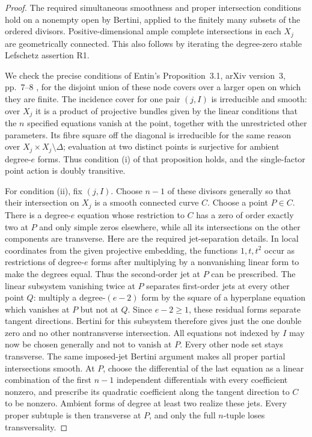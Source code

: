 \begin{proof}
The required simultaneous smoothness and proper intersection
conditions hold on a nonempty open by Bertini, applied to
the finitely many subsets of the ordered divisors.
Positive-dimensional ample complete intersections in each
$X_j$ are geometrically connected.  This also follows by
iterating the degree-zero stable Lefschetz assertion R1.

We check the precise conditions of Entin's
Proposition~3.1, arXiv version~3, pp.~7--8
\cite{Entin2021}, for the disjoint union of these node covers
over a larger open on which they are finite.
The incidence cover for one pair $(j,I)$ is irreducible and
smooth: over $X_j$ it is a product of projective bundles
given by the linear conditions that the $n$ specified
equations vanish at the point, together with the unrestricted
other parameters.  Its fibre square off the diagonal is
irreducible for the same reason over
$X_j\times X_j\setminus\Delta$; evaluation at two distinct
points is surjective for ambient degree-$e$ forms.
Thus condition (i) of that proposition holds, and the
single-factor point action is doubly transitive.

For condition (ii), fix $(j,I)$.  Choose $n-1$ of these
divisors generally so that their intersection on $X_j$ is
a smooth connected curve $C$.  Choose a point $P\in C$.
There is a degree-$e$ equation whose restriction to $C$
has a zero of order exactly two at $P$ and only simple
zeros elsewhere, while all its intersections on the other
components are transverse.  Here are the required
jet-separation details.  In local coordinates from the
given projective embedding, the functions $1,t,t^2$ occur
as restrictions of degree-$e$ forms after multiplying by a
nonvanishing linear form to make the degrees equal.
Thus the second-order jet at $P$ can be prescribed.
The linear subsystem vanishing twice at $P$ separates
first-order jets at every other point $Q$: multiply a
degree-$(e-2)$ form by the square of a hyperplane equation
which vanishes at $P$ but not at $Q$.  Since $e-2\geq1$,
these residual forms separate tangent directions.
Bertini for this subsystem therefore gives just the one
double zero and no other nontransverse intersection.
All equations not indexed by $I$ may now be chosen generally
and not to vanish at $P$.  Every other node set stays
transverse.  The same imposed-jet Bertini argument makes
all proper partial intersections smooth.  At $P$, choose
the differential of the last equation as a linear combination
of the first $n-1$ independent differentials with every
coefficient nonzero, and prescribe its quadratic coefficient
along the tangent direction to $C$ to be nonzero.  Ambient
forms of degree at least two realize these jets.  Every
proper subtuple is then transverse at $P$, and only the
full $n$-tuple loses transversality.


\end{proof}
